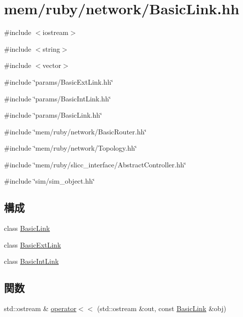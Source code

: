 \hypertarget{BasicLink_8hh}{
\section{mem/ruby/network/BasicLink.hh}
\label{BasicLink_8hh}
}
{\ttfamily \#include $<$iostream$>$}\par
{\ttfamily \#include $<$string$>$}\par
{\ttfamily \#include $<$vector$>$}\par
{\ttfamily \#include \char`\"{}params/BasicExtLink.hh\char`\"{}}\par
{\ttfamily \#include \char`\"{}params/BasicIntLink.hh\char`\"{}}\par
{\ttfamily \#include \char`\"{}params/BasicLink.hh\char`\"{}}\par
{\ttfamily \#include \char`\"{}mem/ruby/network/BasicRouter.hh\char`\"{}}\par
{\ttfamily \#include \char`\"{}mem/ruby/network/Topology.hh\char`\"{}}\par
{\ttfamily \#include \char`\"{}mem/ruby/slicc\_\-interface/AbstractController.hh\char`\"{}}\par
{\ttfamily \#include \char`\"{}sim/sim\_\-object.hh\char`\"{}}\par
\subsection*{構成}
\begin{DoxyCompactItemize}
\item 
class \hyperlink{classBasicLink}{BasicLink}
\item 
class \hyperlink{classBasicExtLink}{BasicExtLink}
\item 
class \hyperlink{classBasicIntLink}{BasicIntLink}
\end{DoxyCompactItemize}
\subsection*{関数}
\begin{DoxyCompactItemize}
\item 
std::ostream \& \hyperlink{BasicLink_8hh_a34beaf565f207efe9f7b985413212b48}{operator$<$$<$} (std::ostream \&out, const \hyperlink{classBasicLink}{BasicLink} \&obj)
\end{DoxyCompactItemize}


